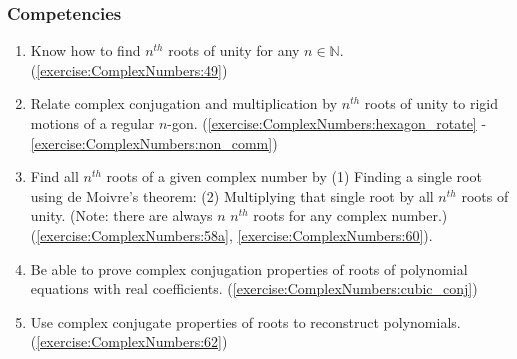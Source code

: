 \subsubsection*{Competencies}
\begin{enumerate}
\item
Know how to find $n^{th}$ roots of unity for any $n \in \mathbb{N}$. (\ref{exercise:ComplexNumbers:49})
\item
Relate complex conjugation and multiplication by $n^{th}$ roots of unity to rigid motions of a regular $n$-gon. (\ref{exercise:ComplexNumbers:hexagon_rotate} - \ref{exercise:ComplexNumbers:non_comm})
\item
Find all $n^{th}$ roots of a given complex number by (1) Finding a single root using de Moivre's theorem: (2) Multiplying that single root by all $n^{th}$ roots of unity. (Note: there are always $n$ $n^{th}$ roots for any complex number.) (\ref{exercise:ComplexNumbers:58a}, \ref{exercise:ComplexNumbers:60}).
\item
Be able to prove complex conjugation properties of roots of polynomial equations with real coefficients. (\ref{exercise:ComplexNumbers:cubic_conj})
\item
Use complex conjugate properties of roots to reconstruct polynomials. (\ref{exercise:ComplexNumbers:62})
\end{enumerate}







